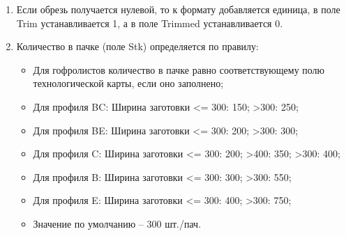 \begin{enumerate}
\begin{itemize}
	 количество полос меньше или равно 2, то такой заказ встанет на нижний стол. Но к нему на верхний стол будет добавлен фиктивный заказ – копия первого с нулевым количеством, длиной/шириной заготовок, полос и т.д.
    \end{itemize}
    \item 	Если обрезь получается нулевой, то к формату добавляется единица, в поле Trim устанавливается 1, а в поле Trimmed устанавливается 0.
    \item 	Количество в пачке (поле Stk) определяется по правилу:
        \begin{itemize}
       \item 	Для гофролистов количество в пачке равно соответствующему полю технологической карты, если оно заполнено;
       \item 	Для профиля BC: Ширина заготовки <= 300: 150; >300: 250;
       \item 	Для профиля BE: Ширина заготовки <= 300: 200; >300: 300;
       \item 	Для профиля C: Ширина заготовки <= 300: 200; >400: 350; >300: 400;
       \item 	Для профиля B: Ширина заготовки <= 300: 300; >300: 550;
       \item 	Для профиля E: Ширина заготовки <= 300: 400; >300: 750;
       \item 	Значение по умолчанию – 300 шт./пач.
    \end{itemize}
    
\end{enumerate}






